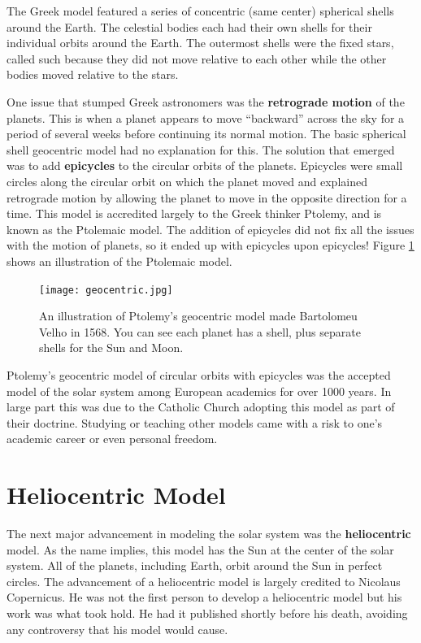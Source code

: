 \documentclass[12pt]{book}
\begin{document}
The Greek model featured a series of concentric (same center) spherical shells around the Earth. The celestial bodies each had their own shells for their individual orbits around the Earth. The outermost shells were the fixed stars, called such because they did not move relative to each other while the other bodies moved relative to the stars.

One issue that stumped Greek astronomers was the \textbf{retrograde motion} of the planets. This is when a planet appears to move ``backward'' across the sky for a period of several weeks before continuing its normal motion. The basic spherical shell geocentric model had no explanation for this. The solution that emerged was to add \textbf{epicycles} to the circular orbits of the planets. Epicycles were small circles along the circular orbit on which the planet moved and explained retrograde motion by allowing the planet to move in the opposite direction for a time. This model is accredited largely to the Greek thinker Ptolemy, and is known as the Ptolemaic model. The addition of epicycles did not fix all the issues with the motion of planets, so it ended up with epicycles upon epicycles! Figure \ref{geocentric} shows an illustration of the Ptolemaic model.

\begin{figure}[t]
\centering
\texttt{[image: geocentric.jpg]}
\caption{An illustration of Ptolemy's geocentric model made Bartolomeu Velho in 1568. You can see each planet has a shell, plus separate shells for the Sun and Moon.}
\label{geocentric}
\end{figure}

Ptolemy's geocentric model of circular orbits with epicycles was the accepted model of the solar system among European academics for over 1000 years. In large part this was due to the Catholic Church adopting this model as part of their doctrine. Studying or teaching other models came with a risk to one's academic career or even personal freedom.

\section{Heliocentric Model}

The next major advancement in modeling the solar system was the \textbf{heliocentric} model. As the name implies, this model has the Sun at the center of the solar system. All of the planets, including Earth, orbit around the Sun in perfect circles. The advancement of a heliocentric model is largely credited to Nicolaus Copernicus. He was not the first person to develop a heliocentric model but his work was what took hold. He had it published shortly before his death, avoiding any controversy that his model would cause.
\end{document}
